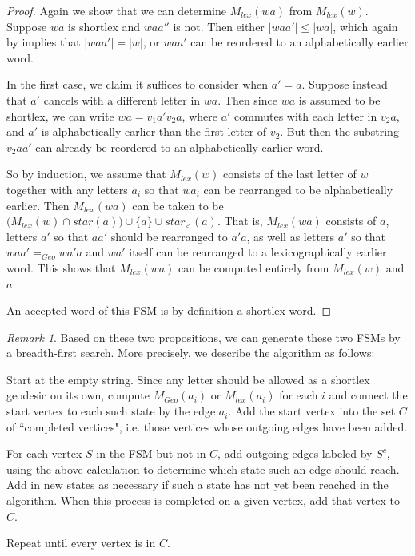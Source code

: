 \documentclass{amsart}
\theoremstyle{definition}
\theoremstyle{remark}
\newtheorem{remark}[theorem]{Remark}
\begin{document}
	\begin{proof}
		
		Again we show that we can determine $M_{lex}(wa)$ from $M_{lex}(w)$. Suppose $wa$ is shortlex and $waa''$ is not. Then either $|waa'|\le |wa|$, which again by \cite{Davis} implies that $|waa'|=|w|$, or $waa'$ can be reordered to an alphabetically earlier word.
		
		In the first case, we claim it suffices to consider when $a'=a$. Suppose instead that $a'$ cancels with a different letter in $wa$. Then since $wa$ is assumed to be shortlex, we can write $wa=v_1a'v_2a$, where $a'$ commutes with each letter in $v_2a$, and $a'$ is alphabetically earlier than the first letter of $v_2$. But then the substring $v_2aa'$ can already be reordered to an alphabetically earlier word.
		
		So by induction, we assume that $M_{lex}(w)$ consists of the last letter of $w$ together with any letters $a_i$ so that $wa_i$ can be rearranged to be alphabetically earlier. Then $M_{lex}(wa)$ can be taken to be $\bigl(M_{lex}(w)\cap star(a)\bigr)\cup \{a\}\cup star_<(a)$. That is, $M_{lex}(wa)$ consists of $a$, letters $a'$ so that $aa'$ should be rearranged to $a'a$, as well as letters $a'$ so that $waa'=_{Geo}wa'a$ and $wa'$ itself can be rearranged to a lexicographically earlier word. This shows that $M_{lex}(wa)$ can be computed entirely from $M_{lex}(w)$ and $a$.
		
		An accepted word of this FSM is by definition a shortlex word.
	\end{proof}
	
	\begin{remark}
		
		Based on these two propositions, we can generate these two FSMs by a breadth-first search. More precisely, we describe the algorithm as follows:
		
		Start at the empty string. Since any letter should be allowed as a shortlex geodesic on its own, compute $M_{Geo}(a_i)$ or $M_{lex}(a_i)$ for each $i$ and connect the start vertex to each such state by the edge $a_i$. Add the start vertex into the set $C$ of ``completed vertices", i.e. those vertices whose outgoing edges have been added.
		
		For each vertex $S$ in the FSM but not in $C$, add outgoing edges labeled by $S^c$, using the above calculation to determine which state such an edge should reach. Add in new states as necessary if such a state has not yet been reached in the algorithm. When this process is completed on a given vertex, add that vertex to $C$.
		
		Repeat until every vertex is in $C$.
		
	\end{remark}
	
\end{document}
